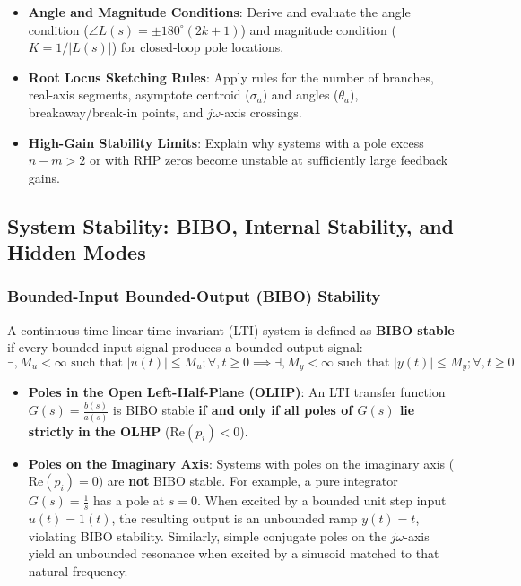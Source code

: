 \documentclass[12pt,onecolumn,twoside ]{article}
\begin{document}
\begin{itemize}
		\item[$\square$]
		\textbf{Angle and Magnitude Conditions}: Derive and evaluate the angle condition ($\angle L(s) = \pm 180^\circ(2k+1)$) and magnitude condition ($K = 1/|L(s)|$) for closed-loop pole locations.
		\item[$\square$]
		\textbf{Root Locus Sketching Rules}: Apply rules for the number of branches, real-axis segments, asymptote centroid ($\sigma_a$) and angles ($\theta_a$), breakaway/break-in points, and $j\omega$-axis crossings.
		\item[$\square$]
		\textbf{High-Gain Stability Limits}: Explain why systems with a pole excess $n - m > 2$ or with RHP zeros become unstable at sufficiently large feedback gains.
	\end{itemize}
	
	\subsection{System Stability: BIBO, Internal Stability, and Hidden Modes}
	\subsubsection{Bounded-Input Bounded-Output (BIBO) Stability}
	A continuous-time linear time-invariant (LTI) system is defined as \textbf{BIBO stable} if every bounded input signal produces a bounded output signal: \[
	\exists , M_u < \infty \text{ such that } |u(t)| \le M_u ; \forall , t \ge 0 \implies \exists , M_y < \infty \text{ such that } |y(t)| \le M_y ; \forall , t \ge 0
	\]
	\begin{itemize}
		\item
		\textbf{Poles in the Open Left-Half-Plane (OLHP)}: An LTI transfer function $G(s) = \frac{b(s)}{a(s)}$ is BIBO stable \textbf{if and only if all poles of $G(s)$ lie strictly in the OLHP} ($\text{Re}(p_i) < 0$).
		\item
		\textbf{Poles on the Imaginary Axis}: Systems with poles on the imaginary axis ($\text{Re}(p_i) = 0$) are \textbf{not} BIBO stable. For example, a pure integrator $G(s) = \frac{1}{s}$ has a pole at $s = 0$. When excited by a bounded unit step input $u(t) = 1(t)$, the resulting output is an unbounded ramp $y(t) = t$, violating BIBO stability. Similarly, simple conjugate poles on the $j\omega$-axis yield an unbounded resonance when excited by a sinusoid matched to that natural frequency.
	\end{itemize}
\end{document}
